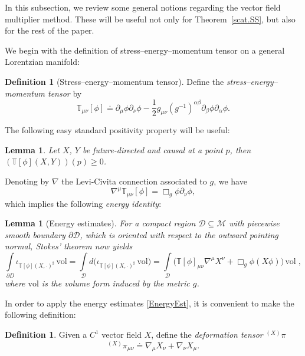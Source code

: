 \documentclass[10pt, reqno]{amsart}
\newtheorem{lemma}[theorem]{Lemma}
\theoremstyle{definition}
\newtheorem{definition}[theorem]{Definition}
\theoremstyle{remark}
\numberwithin{equation}{section}
\newcommand{\rd}{\partial}
\newcommand{\0}{\emptyset}
\newcommand{\alp}{\alpha}
\newcommand{\bt}{\beta}
\newcommand{\f}{\frac}
\newcommand{\T}{\mathbb T}
\newcommand{\vol}{\mathrm{vol}}
\begin{document}
In this subsection, we review some general notions regarding the vector field multiplier method. These will be useful not only for Theorem~\ref{scat.SS}, but also for the rest of the paper.

We begin with the definition of stress--energy--momentum tensor on a general Lorentzian manifold:
\begin{definition}[Stress--energy--momentum tensor]
Define the \emph{stress--energy--momentum tensor} by
$$\mathbb T_{\mu\nu}[\phi] \doteq \rd_\mu\phi\rd_\nu\phi-\f 12 g_{\mu\nu} (g^{-1})^{\alp\bt}\rd_{\bt}\phi\rd_{\alp}\phi.$$
\end{definition}
The following easy standard positivity property will be useful:
\begin{lemma}\label{positivity}
Let $X$, $Y$ be future-directed and causal at a point $p$, then $(\T[\phi](X,Y))(p)\geq 0$.
\end{lemma}
Denoting by $\nabla$ the Levi-Civita connection associated to $g$, we have
$$\nabla^\mu \mathbb T_{\mu\nu}[\phi]=\Box_g\phi\rd_\nu\phi,$$ 
which implies the following \emph{energy identity}:
\begin{lemma}[Energy estimates]\label{lem:energy.identity}
For a compact region $\mathcal D \subseteq \mathcal M$ with piecewise smooth boundary $\partial \mathcal D$, which is oriented with respect to the outward pointing normal, Stokes' theorem now yields
\begin{equation}
\label{EnergyEst}
\int\limits_{\partial D} \iota_{\T[\phi](X, \cdot)^\sharp} \,\vol = \int\limits_{\mathcal D} d\big(  \iota_{\T[\phi](X, \cdot)^\sharp} \,\vol\big) = \int\limits_{\mathcal D} \Big(\T[\phi]_{\mu \nu} \nabla^\mu X^\nu + \Box_g \phi (X\phi) \Big) \, \vol \;,
\end{equation}
where $\vol$ is the volume form induced by the metric $g$.
\end{lemma}

In order to apply the energy estimates \eqref{EnergyEst}, it is convenient to make the following definition:
\begin{definition}
Given a $C^1$ vector field $X$, define the \emph{deformation tensor} ${ }^{(X)}\pi$
$${ }^{(X)}\pi_{\mu\nu} \doteq \nabla_\mu X_{\nu} +\nabla_\nu X_\mu.$$
\end{definition}
\end{document}
